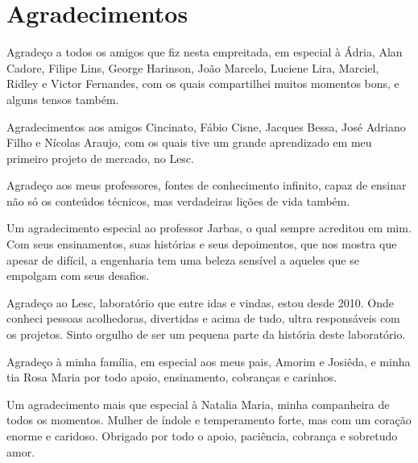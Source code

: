 \documentclass[monografia.tex]{subfiles}
\begin{document}
	\chapter*{Agradecimentos}
    

   Agradeço a todos os amigos que fiz nesta empreitada, em especial à Ádria, Alan Cadore, Filipe Lins, George Harinson, João Marcelo,
   Luciene Lira, Marciel, Ridley e
   Victor Fernandes, com os quais compartilhei muitos momentos bons, e alguns tensos também. 
   
   Agradecimentos aos amigos Cincinato, Fábio Cisne, Jacques Bessa, José Adriano Filho e Nícolas Araujo, com os quais tive um grande aprendizado 
   em meu primeiro projeto de mercado, no Lesc.

   Agradeço aos meus professores, fontes de conhecimento infinito, capaz de ensinar não só os conteúdos técnicos, mas verdadeiras lições de vida também.

   Um agradecimento especial ao professor Jarbas, o qual sempre acreditou em mim. Com seus ensinamentos, suas histórias e seus depoimentos,
   que nos mostra que apesar de difícil, a engenharia tem uma beleza sensível a aqueles que se empolgam com seus desafios.

   Agradeço ao Lesc, laboratório que entre idas e vindas, estou desde 2010. Onde conheci pessoas acolhedoras, divertidas e acima de tudo, ultra responsáveis 
   com os projetos. Sinto orgulho de ser um pequena parte da história deste laboratório.

   Agradeço à minha família, em especial aos meus pais, Amorim e Josiêda, e minha tia Rosa Maria por todo apoio, ensinamento, cobranças e carinhos.

   Um agradecimento mais que especial à Natalia Maria, minha companheira de todos os momentos. Mulher de índole e temperamento forte, mas com um coração
   enorme e caridoso. Obrigado por todo o apoio, paciência, cobrança e sobretudo amor. 
   



	\newpage    
    
\end{document}
